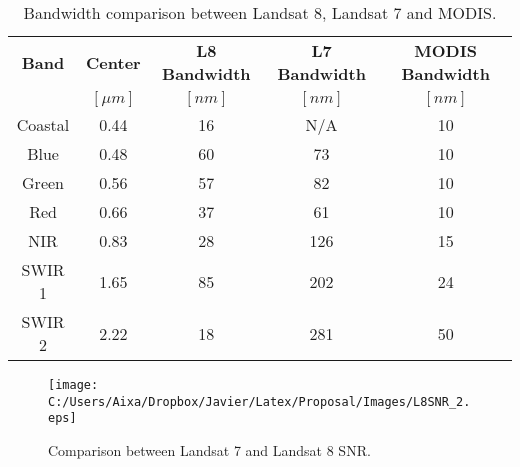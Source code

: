 \begin{table}[!ht]
\caption{ Bandwidth comparison between Landsat 8, Landsat 7 and MODIS. \label{tab:bandwidth}} 
\centering
      \begin{tabular}{c|c|c|c|c}
          \bfseries{Band}& \bfseries{Center}   & \bfseries{L8 Bandwidth} & \bfseries{L7 Bandwidth} & \bfseries{MODIS Bandwidth} \\ 
                  & \bfseries{$[\mu m]$} & $[nm]$   & $[nm]$ & $[nm]$   \\ \hline \hline
          Coastal & 0.44 & 16 & N/A & 10  \\
          Blue    & 0.48 & 60 & 73  & 10  \\
          Green   & 0.56 & 57 & 82  & 10  \\
          Red     & 0.66 & 37 & 61  & 10  \\  
          NIR     & 0.83 & 28 & 126 & 15  \\
          SWIR 1  & 1.65 & 85 & 202 & 24  \\
          SWIR 2  & 2.22 & 18 & 281 & 50  \\ 
       \end{tabular}
\end{table}

\begin{figure}[htb]
\centering
      \texttt{[image: C:/Users/Aixa/Dropbox/Javier/Latex/Proposal/Images/L8SNR\_2.eps]}
      \caption{Comparison between Landsat 7 and Landsat 8 SNR. \label{fig:L8SNR} } 
      \label{fig:olisnr}
\end{figure}

